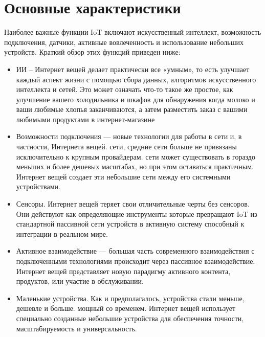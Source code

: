 \section{Основные характеристики}

Наиболее важные функции IoT включают искусственный интеллект, возможность подключения, датчики, активные
вовлеченность и использование небольших устройств. Краткий обзор этих функций приведен ниже:
\begin{itemize}
    \item ИИ – Интернет вещей делает практически все «умным», то есть улучшает каждый аспект
    жизни с помощью сбора данных, алгоритмов искусственного интеллекта и сетей.
    Это может означать что-то такое же простое, как улучшение вашего холодильника и шкафов для обнаружения
    когда молоко и ваши любимые хлопья заканчиваются, а затем разместить заказ с вашими любимыми
    продуктами в интернет-магазине
    \item Возможности подключения — новые технологии для работы в сети и, в частности, Интернета вещей.
    сети, средние сети больше не привязаны исключительно к крупным провайдерам. сети
    может существовать в гораздо меньших и более дешевых масштабах, но при этом оставаться практичным. Интернет вещей создает
    эти небольшие сети между его системными устройствами.\cite{IoTAzure}
    \item Сенсоры. Интернет вещей теряет свои отличительные черты без сенсоров. Они действуют как определяющие инструменты
    которые превращают IoT из стандартной пассивной сети устройств в активную систему
    способный к интеграции в реальном мире.
    \item Активное взаимодействие — большая часть современного взаимодействия с подключенными технологиями происходит
    через пассивное взаимодействие. Интернет вещей представляет новую парадигму активного контента, продуктов,
    или участие в обслуживании.
    \item Маленькие устройства. Как и предполагалось, устройства стали меньше, дешевле и больше.
    мощный со временем. Интернет вещей использует специально созданные небольшие устройства для обеспечения точности,
    масштабируемость и универсальность.
\end{itemize}